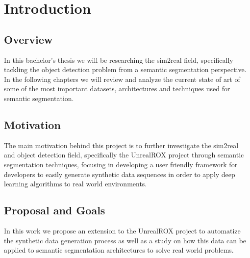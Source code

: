 
\chapter{Introduction}
\label{introduction}


\section{Overview}	
In this bachelor's thesis we will be researching the sim2real field, specifically tackling the object detection problem from a semantic segmentation perspective. In the following chapters we will review and analyze the current state of art of some of the most important datasets, architectures and techniques used for semantic segmentation.

\section{Motivation}

The main motivation behind this project is to further investigate the sim2real and object detection field, specifically the UnrealROX project through semantic segmentation techniques, focusing in developing a user friendly framework for developers to easily generate synthetic data sequences in order to apply deep learning algorithms to real world environments. 

\section{Proposal and Goals}

In this work we propose an extension to the UnrealROX project to automatize the synthetic data generation process as well as a study on how this data can be applied to semantic segmentation architectures to solve real world problems.

